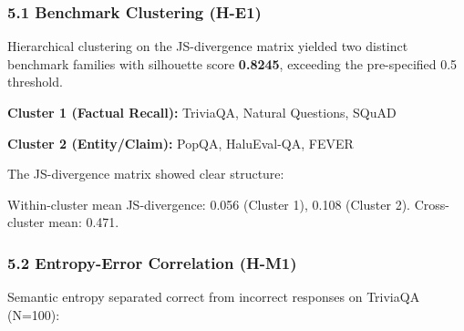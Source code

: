 
\subsubsection{5.1 Benchmark Clustering (H-E1)}

Hierarchical clustering on the JS-divergence matrix yielded two distinct benchmark families with silhouette score \textbf{0.8245}, exceeding the pre-specified 0.5 threshold.

\textbf{Cluster 1 (Factual Recall):} TriviaQA, Natural Questions, SQuAD

\textbf{Cluster 2 (Entity/Claim):} PopQA, HaluEval-QA, FEVER

The JS-divergence matrix showed clear structure:

\begin{table}[htbp]
\centering
{}
\end{table}

Within-cluster mean JS-divergence: 0.056 (Cluster 1), 0.108 (Cluster 2). Cross-cluster mean: 0.471.

\subsubsection{5.2 Entropy-Error Correlation (H-M1)}

Semantic entropy separated correct from incorrect responses on TriviaQA (N=100):

\begin{table}[htbp]
\centering
{}
\end{table}

